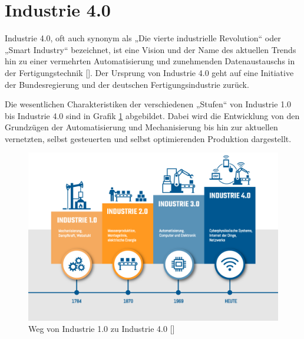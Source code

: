 \section{Industrie 4.0}
\label{sec:industrie40}

Industrie 4.0, oft auch synonym als „Die vierte industrielle Revolution“ oder „Smart Industry“ bezeichnet, ist eine Vision und der Name des aktuellen Trends hin zu einer vermehrten Automatisierung und zunehmenden Datenaustauschs in der Fertigungstechnik [\cite{industrie40anderl}]. Der Ursprung von Industrie 4.0 geht auf eine Initiative der Bundesregierung und der deutschen Fertigungsindustrie zurück.

Die wesentlichen Charakteristiken der verschiedenen „Stufen“ von Industrie 1.0 bis Industrie 4.0 sind in Grafik \ref{fig:Industrie1.0-zu-4.0} abgebildet. Dabei wird die Entwicklung von den Grundzügen der Automatisierung und Mechanisierung bis hin zur aktuellen vernetzten, selbst gesteuerten und selbst optimierenden Produktion dargestellt.
%
\begin{figure}[htbp]
	\centering\includegraphics[width=1.0\textwidth]{images/02/Industrie1.0-zu-4.0.png}
    \caption{Weg von Industrie 1.0 zu Industrie 4.0 [\cite{wegIndustrie10zu40}]}
    \label{fig:Industrie1.0-zu-4.0}
\end{figure}


